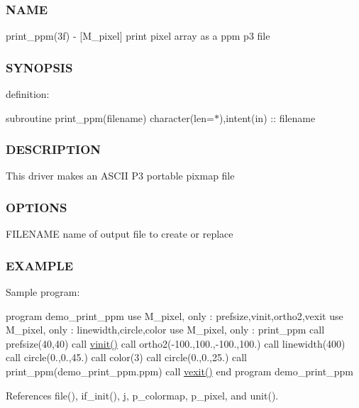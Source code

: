 \subsubsection*{N\+A\+ME}

print\+\_\+ppm(3f) -\/ \mbox{[}M\+\_\+pixel\mbox{]} print pixel array as a ppm p3 file 

\subsubsection*{S\+Y\+N\+O\+P\+S\+IS}

definition\+:

subroutine print\+\_\+ppm(filename) character(len=$\ast$),intent(in) \+:\+: filename

\subsubsection*{D\+E\+S\+C\+R\+I\+P\+T\+I\+ON}

This driver makes an A\+S\+C\+II P3 portable pixmap file

\subsubsection*{O\+P\+T\+I\+O\+NS}

F\+I\+L\+E\+N\+A\+ME name of output file to create or replace

\subsubsection*{E\+X\+A\+M\+P\+LE}

Sample program\+:

program demo\+\_\+print\+\_\+ppm use M\+\_\+pixel, only \+: prefsize,vinit,ortho2,vexit use M\+\_\+pixel, only \+: linewidth,circle,color use M\+\_\+pixel, only \+: print\+\_\+ppm call prefsize(40,40) call \hyperlink{namespacem__pixel_ac03ca8f23fdadb60599b6ea4dc87a6d9}{vinit()} call ortho2(-\/100.,100.,-\/100.,100.) call linewidth(400) call circle(0.,0.,45.) call color(3) call circle(0.,0.,25.) call print\+\_\+ppm(\textquotesingle{}demo\+\_\+print\+\_\+ppm.\+ppm\textquotesingle{}) call \hyperlink{namespacem__pixel_a19ad6b65752322b0029a62cc0ebec3e8}{vexit()} end program demo\+\_\+print\+\_\+ppm 

References file(), if\+\_\+init(), j, p\+\_\+colormap, p\+\_\+pixel, and unit().

\mbox{\label{namespacem__pixel_a664375b036092dbebe1bccdc67254e1d}} 
